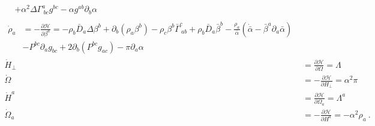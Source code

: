 \begin{subequations}
\begin{align}
\begin{split}
& + \alpha^{2}\Delta \Gamma^{a}_{~bc}g^{bc} - \alpha g^{ab}\partial_{b}\alpha
\end{split}\\
\begin{split}
{\dot \rho}_{a} & = -\frac{\partial \mathscr{H}}{\partial \beta^{a}} = - \rho_{b}{\bar D}_{a}\Delta\beta^{b} + \partial_{b}\left(\rho_{a}\beta^{b}\right) - \rho_{c}\beta^{b}{\bar \Gamma}^{c}_{~ab} + \rho_{b}{\bar D}_{a}{\bar \beta}^{b} - \frac{\rho_{a}}{{\bar \alpha}}\left({\dot {\bar \alpha}} - {\bar \beta}^{a}\partial_{a}{\bar \alpha}\right)\\
& - P^{bc}\partial_{a}g_{bc} + 2\partial_{b}\left(P^{bc}g_{ac}\right) - \pi \partial_{a}\alpha
\end{split}\\
{\dot H}_{\perp} & = \frac{\partial \mathscr{H}}{\partial \Omega } = \Lambda\\
{\dot \Omega} & = - \frac{\partial \mathscr{H}}{\partial H_{\perp}} = \alpha^{2}\pi\\
{\dot H}^{a} & = \frac{\partial \mathscr{H}}{\partial \Omega_{a}} = \Lambda^{a}\\
{\dot \Omega}_{a} & = - \frac{\partial \mathscr{H}}{\partial H^{a}} = -\alpha^{2}\rho_{a} \ .
\end{align}
\end{subequations}

